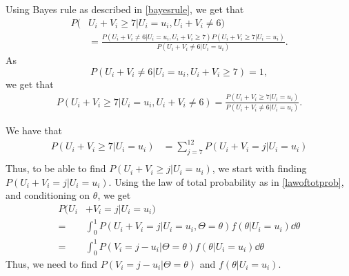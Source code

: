 Using Bayes rule as described in \eqref{bayesrule}, we get that
\begin{equation}
\label{redmajor2}
    \begin{aligned}
        P(&U_i+V_i \geq 7 | U_i=u_i,U_i+V_i \neq 6) \\[6pt]
        &= \frac{P(U_i+V_i\neq6|U_i=u_i,U_i+V_i\geq7)P(U_i+V_i\geq7|U_i=u_i)}{P(U_i+V_i\neq6|U_i=u_i)}.
    \end{aligned}
\end{equation}
As 
\begin{equation*}
    P(U_i+V_i\neq6|U_i=u_i,U_i+V_i\geq7) = 1,
\end{equation*}
we get that
\begin{equation}
\label{redmajor3}
    \begin{aligned}
        P(U_i+V_i \geq 7 | U_i=u_i,U_i+V_i \neq 6)
        = \frac{P(U_i+V_i\geq7|U_i=u_i)}{P(U_i+V_i\neq6|U_i=u_i)}.
    \end{aligned}
\end{equation}


We have that
\begin{equation}
\label{redmajor1}
    \begin{aligned}
        P(U_i+V_i \geq 7 | U_i=u_i) 
        &= \sum_{j=7}^{12} P(U_i+V_i = j | U_i=u_i)\\[6pt]
    \end{aligned}
\end{equation}
Thus, to be able to find $P(U_i+V_i \geq j | U_i=u_i)$, we start with finding $P(U_i+V_i = j | U_i=u_i)$. Using the law of total probability as in \eqref{lawoftotprob}, and conditioning on $\theta$, we get
\begin{equation} 
\label{prob_red_major}
    \begin{aligned}
        P(U_i&+V_i = j | U_i=u_i) \\[6pt]
        =& \int_0^1 P(U_i+V_i = j | U_i=u_i, \Theta=\theta) f(\theta| U_i=u_i) \dd \theta \\[6pt]
        =& \int_0^1 P(V_i = j-u_i | \Theta=\theta) f(\theta| U_i=u_i) \dd \theta
    \end{aligned}
\end{equation}
Thus, we need to find $P(V_i = j-u_i | \Theta=\theta)$ and $f(\theta| U_i=u_i)$. 


